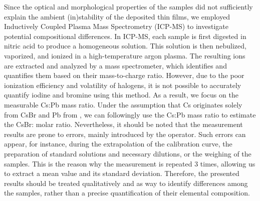 Since the optical and morphological properties of the samples did not sufficiently explain the ambient (in)stability of the deposited thin films, we employed Inductively Coupled Plasma Mass Spectrometry (ICP-MS) to investigate potential compositional differences. In ICP-MS, each sample is first digested in nitric acid to produce a homogeneous solution. This solution is then nebulized, vaporized, and ionized in a high-temperature argon plasma. The resulting ions are extracted and analyzed by a mass spectrometer, which identifies and quantifies them based on their mass-to-charge ratio. However, due to the poor ionization efficiency and volatility of halogens, it is not possible to accurately quantify iodine and bromine using this method. As a result, we focus on the measurable Cs:Pb mass ratio. Under the assumption that Cs originates solely from CsBr and Pb from , we can followingly use the Cs:Pb mass ratio to estimate the CsBr: molar ratio. Nevertheless, it should be noted that the measurement results are prone to errors, mainly introduced by the operator. Such errors can appear, for instance, during the extrapolation of the calibration curve, the preparation of standard solutions and necessary dilutions, or the weighing of the samples. This is the reason why the measurement is repeated 3 times, allowing us to extract a mean value and its standard deviation. Therefore, the presented results should be treated qualitatively and as way to identify differences among the samples, rather than a precise quantification of their elemental composition. 

